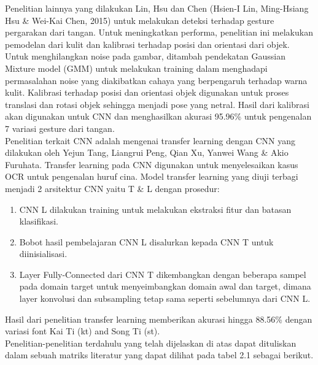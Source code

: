 Penelitian lainnya yang dilakukan Lin, Hsu dan Chen (Hsien-I Lin, Ming-Hsiang Hsu \& Wei-Kai Chen, 2015) untuk melakukan deteksi terhadap gesture pergarakan dari tangan. Untuk meningkatkan performa, penelitian ini melakukan pemodelan dari kulit dan kalibrasi terhadap posisi dan orientasi dari objek. Untuk menghilangkan noise pada gambar, ditambah pendekatan Gaussian Mixture model (GMM) untuk melakukan training dalam menghadapi permasalahan noise yang diakibatkan cahaya yang berpengaruh terhadap warna kulit. Kalibrasi terhadap posisi dan orientasi objek digunakan untuk proses translasi dan rotasi objek sehingga menjadi pose yang netral. Hasil dari kalibrasi akan digunakan untuk CNN dan menghasilkan akurasi 95.96\% untuk pengenalan 7 variasi gesture dari tangan.\\
Penelitian terkait CNN adalah mengenai transfer learning dengan CNN yang dilakukan oleh Yejun Tang, Liangrui Peng, Qian Xu, Yanwei Wang \& Akio Furuhata. Transfer learning pada CNN digunakan untuk menyelesaikan kasus OCR untuk pengenalan huruf cina. Model transfer learning yang diuji terbagi menjadi 2 arsitektur CNN yaitu T \& L dengan prosedur:
\begin{enumerate}
	\item CNN L dilakukan training untuk melakukan ekstraksi fitur dan batasan klasifikasi.
	\item Bobot hasil pembelajaran CNN L disalurkan kepada CNN T untuk diinisialisasi.
	\item Layer Fully-Connected dari CNN T dikembangkan dengan beberapa sampel pada domain target untuk menyeimbangkan domain awal dan target, dimana layer konvolusi dan subsampling tetap sama seperti sebelumnya dari CNN L.
\end{enumerate}
Hasil dari penelitian transfer learning memberikan akurasi hingga  88.56\%  dengan variasi font Kai Ti (kt) and Song Ti (st).\\
Penelitian-penelitian terdahulu yang telah dijelaskan di atas dapat dituliskan dalam sebuah matriks literatur yang dapat dilihat pada tabel 2.1 sebagai berikut.
